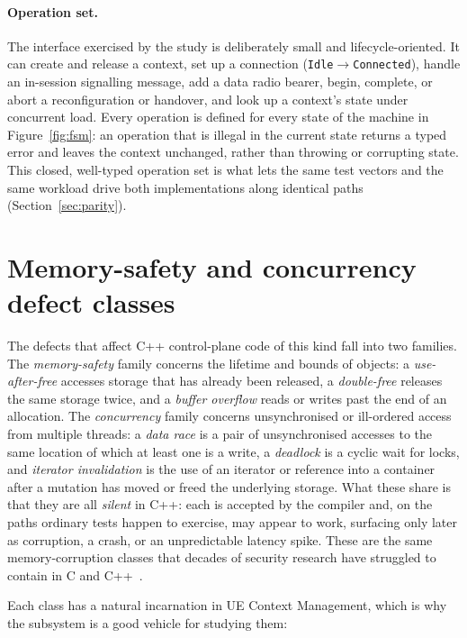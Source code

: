 \documentclass[english,oneside,a4paper,censored,csm,software-track-2020]{HYthesisML}
\begin{document}
\paragraph{Operation set.}
The interface exercised by the study is deliberately small and lifecycle-oriented. It can create
and release a context, set up a connection (\texttt{Idle}$\rightarrow$\texttt{Connected}), handle
an in-session signalling message, add a data radio bearer, begin, complete, or abort a
reconfiguration or handover, and look up a context's state under concurrent load. Every operation is
defined for every state of the machine in Figure~\ref{fig:fsm}: an operation that is illegal in
the current state returns a typed error and leaves the context unchanged, rather than throwing
or corrupting state. This closed, well-typed operation set is what lets the same test vectors
and the same workload drive both implementations along identical paths
(Section~\ref{sec:parity}).

\section{Memory-safety and concurrency defect classes}\label{sec:defects}
The defects that affect C++ control-plane code of this kind fall into two families. The
\emph{memory-safety} family concerns the lifetime and bounds of objects: a \emph{use-after-free}
accesses storage that has already been released, a \emph{double-free} releases the same storage
twice, and a \emph{buffer overflow} reads or writes past the end of an allocation. The
\emph{concurrency} family concerns unsynchronised or ill-ordered access from multiple threads: a
\emph{data race} is a pair of unsynchronised accesses to the same location of which at least one
is a write, a \emph{deadlock} is a cyclic wait for locks, and \emph{iterator invalidation} is
the use of an iterator or reference into a container after a mutation has moved or freed the
underlying storage. What these share is that they are all \emph{silent} in C++: each is accepted
by the compiler and, on the paths ordinary tests happen to exercise, may appear to work,
surfacing only later as corruption, a crash, or an unpredictable latency spike. These are the
same memory-corruption classes that decades of security research have struggled to contain in C
and C++~\cite{szekeres2013sok}.

Each class has a natural incarnation in UE Context Management, which is why the subsystem is a
good vehicle for studying them:
\end{document}
